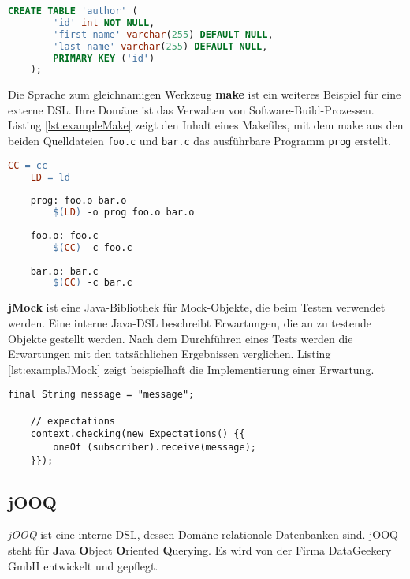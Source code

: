 \begin{lstlisting}[caption={beispielhafter SQL-Code}, language=SQL, label=lst:exampleSQL]
	CREATE TABLE 'author' (
		'id' int NOT NULL,
		'first name' varchar(255) DEFAULT NULL,
		'last name' varchar(255) DEFAULT NULL,
		PRIMARY KEY ('id')
	);
\end{lstlisting}

Die Sprache zum gleichnamigen Werkzeug \textbf{make} ist ein weiteres Beispiel für eine externe DSL. Ihre Domäne ist das Verwalten von Software-Build-Prozessen. Listing \ref{lst:exampleMake} zeigt den Inhalt eines Makefiles, mit dem make aus den beiden Quelldateien \texttt{foo.c} und \texttt{bar.c} das ausführbare Programm \texttt{prog} erstellt.\\
\pagebreak
\begin{lstlisting}[caption={beispielhaftes Makefile}, language=make, label=lst:exampleMake]
	CC = cc
	LD = ld
	
	prog: foo.o bar.o
		$(LD) -o prog foo.o bar.o
	
	foo.o: foo.c
		$(CC) -c foo.c
	
	bar.o: bar.c
		$(CC) -c bar.c
\end{lstlisting}

\textbf{jMock} \cite{www:jmock} ist eine Java-Bibliothek für Mock-Objekte, die beim Testen verwendet werden. Eine interne Java-DSL beschreibt Erwartungen, die an zu testende Objekte gestellt werden. Nach dem Durchführen eines Tests werden die Erwartungen mit den tatsächlichen Ergebnissen verglichen. Listing \ref{lst:exampleJMock} zeigt beispielhaft die Implementierung einer Erwartung.

\begin{lstlisting}[caption={Beispiel für eine Erwartung in jMock},label=lst:exampleJMock]
	final String message = "message";
	        
	// expectations
	context.checking(new Expectations() {{
		oneOf (subscriber).receive(message);
	}});
\end{lstlisting}

\subsection{jOOQ}
\emph{jOOQ}\texttrademark \cite{www:jooq:home} ist eine interne DSL, dessen Domäne relationale Datenbanken sind. jOOQ steht für \textbf{J}ava \textbf{O}bject \textbf{O}riented \textbf{Q}uerying. Es wird von der Firma DataGeekery GmbH \cite{www:datageekery} entwickelt und gepflegt.

